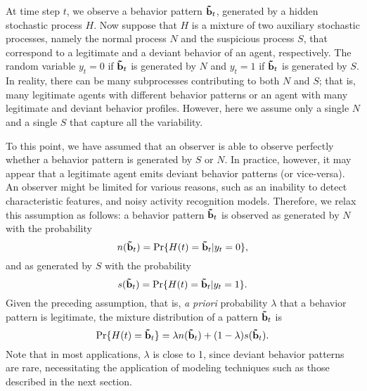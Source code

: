 At time step $t$, we observe a behavior pattern $\mathbf{\tilde{b}}_t$, generated by a hidden stochastic process $H$. Now suppose that $H$ is a mixture of two auxiliary stochastic processes, namely the normal process $N$ and the suspicious process $S$, that correspond to a legitimate and a deviant behavior of an agent, respectively. The random variable $y_t=0$ if $\mathbf{\tilde{b}}_t$ is generated by $N$ and $y_t=1$ if $\mathbf{\tilde{b}}_t$ is generated by $S$. 
In reality, there can be many subprocesses contributing to both $N$ and $S$; that is, many legitimate agents with different behavior patterns or an agent with many legitimate and deviant behavior profiles. However, here we assume only a single $N$ and a single $S$ that capture all the variability. 

To this point, we have assumed that an observer is able to observe perfectly whether a behavior pattern is generated by $S$ or $N$. In practice, however, it may appear that a legitimate agent emits deviant behavior patterns (or vice-versa). An observer might be limited for various reasons, such as an inability to detect characteristic features, and noisy activity recognition models. Therefore, we relax this assumption as follows: a behavior pattern $\mathbf{\tilde{b}}_t$ is observed as generated by $N$ with the probability 
\begin{equation}
	n(\mathbf{\tilde{b}}_t) = \text{Pr}\{H(t)=\mathbf{\tilde{b}}_t|y_t=0\},
\end{equation}
and as generated by $S$ with the probability 
\begin{equation}
	s(\bsig_t) = \Prob\{H(t)=\bsig_t|y_t=1\}.%
\end{equation}
Given the preceding assumption, that is, \emph{a priori} probability $\lambda$ that a behavior pattern is legitimate, the mixture distribution of a pattern $\mathbf{\tilde{b}}_t$ is
\begin{equation}
  \text{Pr}\{H(t)=\mathbf{\tilde{b}}_t\} = \lambda n(\mathbf{\tilde{b}}_t) + (1-\lambda) s(\mathbf{\tilde{b}}_t).
\end{equation}
\noindent
Note that in most applications, $\lambda$ is close to 1, since deviant behavior patterns are rare, necessitating the application of modeling techniques such as those described in the next section.

